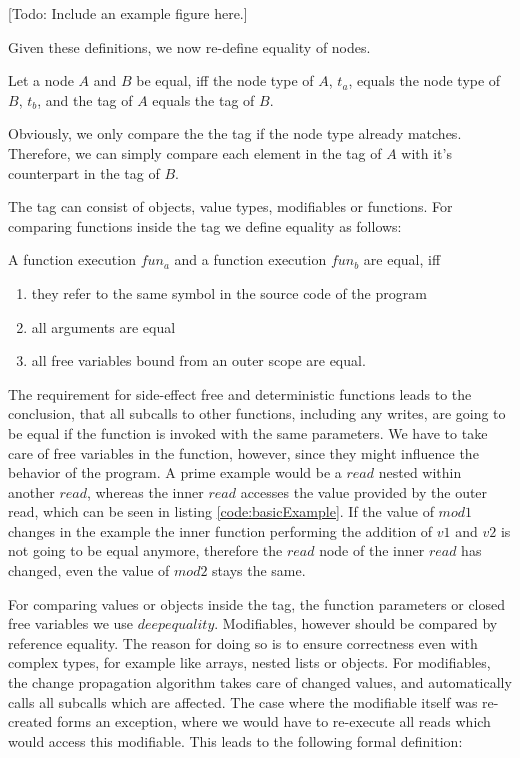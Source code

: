 [Todo: Include an example figure here.]

Given these definitions, we now re-define equality of nodes. 

\begin{definition}
Let a node $A$ and $B$ be equal, iff the node type of $A$, $t_a$, equals the node type of $B$, $t_b$, and the tag of $A$ equals the tag of $B$. 
\end{definition}
Obviously, we only compare the the tag if the node type already matches. Therefore, we can simply compare each element in the tag of $A$ with it's counterpart in the tag of $B$. 

The tag can consist of objects, value types, modifiables or functions. For comparing functions inside the tag we define equality as follows:
\begin{definition}
A function execution $fun_a$ and a function execution $fun_b$ are equal, iff 
\begin{enumerate}
\item they refer to the same symbol in the source code of the program
\item all arguments are equal
\item all free variables bound from an outer scope are equal. 
\end{enumerate}
\end{definition}

The requirement for side-effect free and deterministic functions leads to the conclusion, that all subcalls to other functions, including any writes, are going to be equal if the function is invoked with the same parameters. We have to take care of free variables in the function, however, since they might influence the behavior of the program. A prime example would be a $read$ nested within another $read$, whereas the inner $read$ accesses the value provided by the outer read, which can be seen in listing \ref{code:basicExample}. If the value of $mod1$ changes in the example the inner function performing the addition of $v1$ and $v2$ is not going to be equal anymore, therefore the $read$ node of the inner $read$ has changed, even the value of $mod2$ stays the same. 

For comparing values or objects inside the tag, the function parameters or closed free variables we use $deep equality$. Modifiables, however should be compared by reference equality. The reason for doing so is to ensure correctness even with complex types, for example like arrays, nested lists or objects. For modifiables, the change propagation algorithm takes care of changed values, and automatically calls all subcalls which are affected. The case where the modifiable itself was re-created forms an exception, where we would have to re-execute all reads which would access this modifiable. This leads to the following formal definition: 

